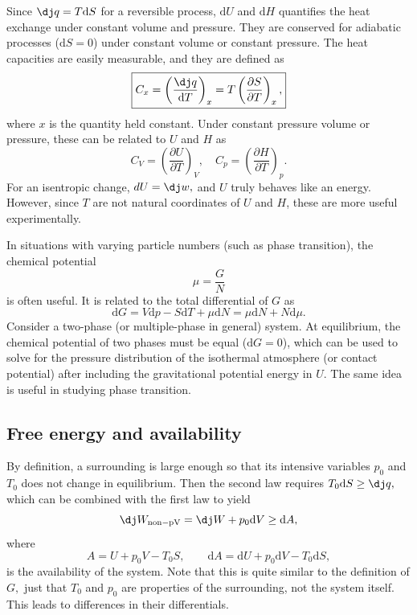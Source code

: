 \documentclass{article}
\theoremstyle{nonumberplain}
\begin{document}
Since $\dj q = T \mathrm{d} S$ for a reversible process, $\mathrm{d} U$ and $\mathrm{d} H$ quantifies the heat exchange under constant volume and pressure. They are conserved for adiabatic processes ($\mathrm{d} S = 0$) under constant volume or constant pressure. 
The heat capacities are easily measurable, and they are defined as
\[
    \boxed{C_x = \left( \frac{\mathrm{\dj}q}{\mathrm{d}T} \right)_x 
    = T \left( \frac{\partial S}{\partial T} \right)_{x}, 
    } 
\]
where $x$ is the quantity held constant. Under constant pressure volume or pressure, these can be related to $U$ and $H$ as
\[
    C_V = \left( \frac{\partial U}{\partial T} \right)_{V},  \quad 
    C_p = \left( \frac{\partial H}{\partial T} \right)_{p}.
\]
For an isentropic change, $dU = \mathrm{\dj} w,$ and $U$ truly behaves like an energy. However, since $T$ are not natural coordinates of $U$ and $H$, these are more useful experimentally. 

In situations with varying particle numbers (such as phase transition), the chemical potential
\[
    \boxed{\mu = \frac{G}{N}}
\]
is often useful. It is related to the total differential of $G$ as 
\[
    \mathrm{d} G = V\mathrm{d} p - S \mathrm{d} T + \mu \mathrm{d} N
     = \mu \mathrm{d} N + N \mathrm{d} \mu. 
\]
Consider a two-phase (or multiple-phase in general) system. At equilibrium, the chemical potential of two phases must be equal ($\mathrm{d} G = 0$), which can be used to solve for the pressure distribution of the isothermal atmosphere (or contact potential) after including the gravitational potential energy in $U.$ The same idea is useful in studying phase transition. 
\subsection{Free energy and availability}
\label{subsec:availability}
By definition, a surrounding is large enough so that its intensive variables $p_0$ and $T_0$ does not change in equilibrium. Then the second law requires
\(
    T_0 \mathrm{d} S \geq  \mathrm{\dj} q,
\)
which can be combined with the first law to yield
\[
    \mathrm{\dj} W_{\mathrm{non-pV} } = \mathrm{\dj} W + p_0 \mathrm{d} V
    \geq \mathrm{d} A,  
\]
where 
\[
    \boxed{A = U + p_0 V - T_0 S,\qquad \mathrm{d}A = \mathrm{d} U + p_{0} \mathrm{d} V - T_0  \mathrm{d} S ,} 
\]
is the availability of the system. Note that this is quite similar to the definition of $G,$ just that $T_0$ and $p_0$ are properties of the surrounding, not the system itself. This leads to differences in their differentials.
\end{document}
